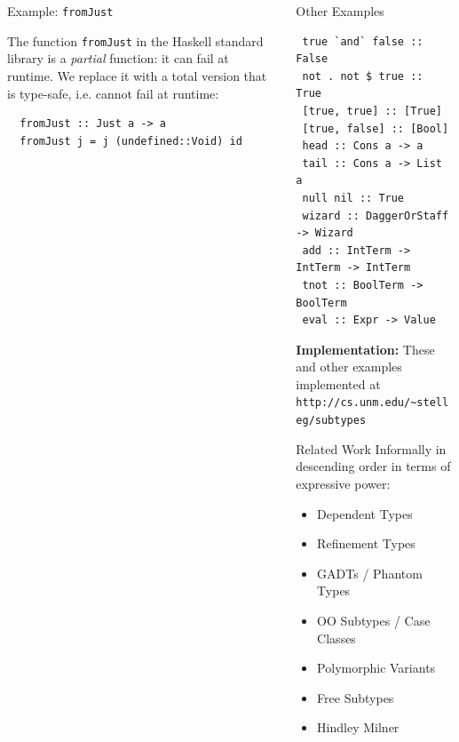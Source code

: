 \documentclass[final]{beamer}
\begin{document}
\begin{frame}[fragile]
\begin{columns}[t]
\begin{column}{.33\textwidth}
\begin{block}{Example: \texttt{fromJust}}
\begin{figure}[!h]
\end{figure}

The function \texttt{fromJust} in the Haskell standard library is a
\emph{partial} function: it can fail at runtime. We replace it with a total
version that is type-safe, i.e. cannot fail at runtime:

\begin{verbatim}
  fromJust :: Just a -> a
  fromJust j = j (undefined::Void) id 
\end{verbatim}

\end{block}

\end{column}

\begin{column}{.285\textwidth}
\begin{block}{Other Examples}
\vspace{0.5cm}

\begin{verbatim}
 true `and` false :: False
 not . not $ true :: True
 [true, true] :: [True]
 [true, false] :: [Bool]
 head :: Cons a -> a
 tail :: Cons a -> List a
 null nil :: True
 wizard :: DaggerOrStaff -> Wizard
 add :: IntTerm -> IntTerm -> IntTerm
 tnot :: BoolTerm -> BoolTerm 
 eval :: Expr -> Value
\end{verbatim}

\textbf{Implementation:} These and other examples implemented at
\texttt{http://cs.unm.edu/\textasciitilde stelleg/subtypes}

\end{block}
\vspace{0.5cm}
\begin{block}{Related Work}
\vspace{0.5cm}
Informally in descending order in terms of expressive power:

\begin{itemize}
\item Dependent Types
\item Refinement Types
\item GADTs / Phantom Types
\item OO Subtypes / Case Classes
\item Polymorphic Variants
\item {\color{red} Free Subtypes}
\item Hindley Milner
\end{itemize}

\end{block}
\end{column}
\end{columns}
\end{frame}
\end{document}
